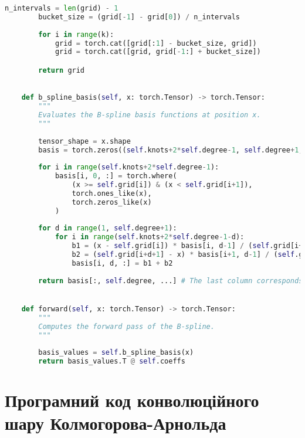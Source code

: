\begin{lstlisting}[language=Python]
        n_intervals = len(grid) - 1
        bucket_size = (grid[-1] - grid[0]) / n_intervals
        
        for i in range(k):
            grid = torch.cat([grid[:1] - bucket_size, grid])
            grid = torch.cat([grid, grid[-1:] + bucket_size])

        return grid
    

    def b_spline_basis(self, x: torch.Tensor) -> torch.Tensor:
        """
        Evaluates the B-spline basis functions at position x.
        """
        
        tensor_shape = x.shape
        basis = torch.zeros((self.knots+2*self.degree-1, self.degree+1, *tensor_shape), dtype=x.dtype, device=x.device)
        
        for i in range(self.knots+2*self.degree-1):
            basis[i, 0, :] = torch.where(
                (x >= self.grid[i]) & (x < self.grid[i+1]), 
                torch.ones_like(x), 
                torch.zeros_like(x)
            )
        
        for d in range(1, self.degree+1):
            for i in range(self.knots+2*self.degree-1-d):
                b1 = (x - self.grid[i]) * basis[i, d-1] / (self.grid[i+d] - self.grid[i])
                b2 = (self.grid[i+d+1] - x) * basis[i+1, d-1] / (self.grid[i+d+1] - self.grid[i+1])
                basis[i, d, :] = b1 + b2
        
        return basis[:, self.degree, ...] # The last column corresponds to the degree of the spline


    def forward(self, x: torch.Tensor) -> torch.Tensor:
        """
        Computes the forward pass of the B-spline.
        """
        
        basis_values = self.b_spline_basis(x)
        return basis_values.T @ self.coeffs
\end{lstlisting}

\chapter{Програмний код конволюційного шару Колмогорова-Арнольда}\label{appendix:c-ckan-code}

